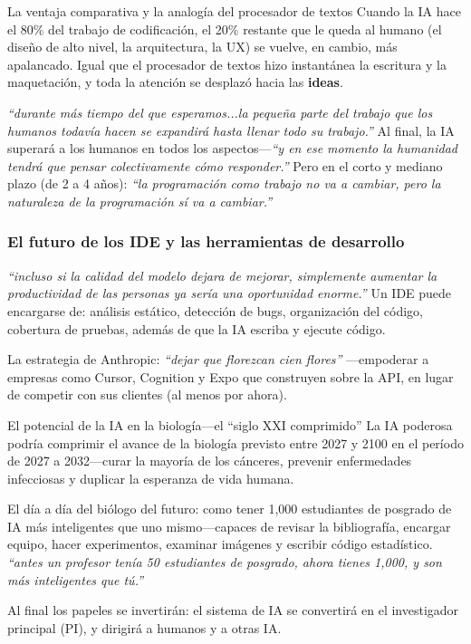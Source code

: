 \begin{knowledgebox}{La ventaja comparativa y la analogía del procesador de textos}
Cuando la IA hace el 80\% del trabajo de codificación, el 20\% restante que le queda al humano (el diseño de alto nivel, la arquitectura, la UX) se vuelve, en cambio, más apalancado. Igual que el procesador de textos hizo instantánea la escritura y la maquetación, y toda la atención se desplazó hacia las \textbf{ideas}.

\textit{``durante más tiempo del que esperamos...la pequeña parte del trabajo que los humanos todavía hacen se expandirá hasta llenar todo su trabajo.''} Al final, la IA superará a los humanos en todos los aspectos—\textit{``y en ese momento la humanidad tendrá que pensar colectivamente cómo responder.''} Pero en el corto y mediano plazo (de 2 a 4 años): \textit{``la programación como trabajo no va a cambiar, pero la naturaleza de la programación sí va a cambiar.''}
\end{knowledgebox}

\subsubsection{El futuro de los IDE y las herramientas de desarrollo}

\textit{``incluso si la calidad del modelo dejara de mejorar, simplemente aumentar la productividad de las personas ya sería una oportunidad enorme.''} Un IDE puede encargarse de: análisis estático, detección de bugs, organización del código, cobertura de pruebas, además de que la IA escriba y ejecute código.

La estrategia de Anthropic: \textit{``dejar que florezcan cien flores''} —empoderar a empresas como Cursor, Cognition y Expo que construyen sobre la API, en lugar de competir con sus clientes (al menos por ahora).

\begin{importantbox}{El potencial de la IA en la biología—el ``siglo XXI comprimido''}
La IA poderosa podría comprimir el avance de la biología previsto entre 2027 y 2100 en el período de 2027 a 2032—curar la mayoría de los cánceres, prevenir enfermedades infecciosas y duplicar la esperanza de vida humana.

El día a día del biólogo del futuro: como tener 1,000 estudiantes de posgrado de IA más inteligentes que uno mismo—capaces de revisar la bibliografía, encargar equipo, hacer experimentos, examinar imágenes y escribir código estadístico. \textit{``antes un profesor tenía 50 estudiantes de posgrado, ahora tienes 1,000, y son más inteligentes que tú.''}

Al final los papeles se invertirán: el sistema de IA se convertirá en el investigador principal (PI), y dirigirá a humanos y a otras IA.
\end{importantbox}

